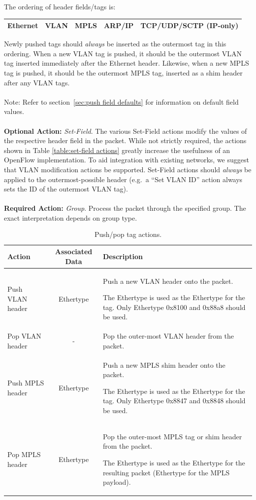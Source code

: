 \documentclass[10pt]{article}
\begin{document}
The ordering of header fields/tags is:
\begin{center}
\begin{tabular}{|l|l|l|l|l|}
\hline
Ethernet & VLAN & MPLS & ARP/IP & TCP/UDP/SCTP (IP-only) \\
\hline
\end{tabular}
\end{center}
Newly pushed tags should \emph{always} be inserted as the outermost tag in this ordering. When a new VLAN tag is pushed, it should be the outermost VLAN tag inserted immediately after the Ethernet header. Likewise, when a new MPLS tag is pushed, it should be the outermost MPLS tag, inserted as a shim header after any VLAN tags.
\\\\
Note: Refer to section~\ref{sec:push field defaults} for information on default field values.
\\\\
\textbf{Optional Action:} \emph{Set-Field}.  The various Set-Field actions modify the values of the respective header field in the packet. While not strictly required, the actions shown in Table \ref{table:set-field actions}  greatly increase the usefulness of an OpenFlow implementation.  To aid integration with existing networks, we suggest that VLAN modification actions be supported. Set-Field actions should \emph{always} be applied to the outermost-possible header (e.g.~a ``Set VLAN ID'' action always sets the ID of the outermost VLAN tag).
\\\\
\textbf{Required Action:} \emph{Group}.  Process the packet through the specified group.  The exact interpretation depends on group type. 

\begin{table}[hbp]
\centering
\footnotesize
\begin{tabularx}{\textwidth}{ |l|c|X| }
\hline
Action & Associated Data & Description \\
\hline
Push VLAN header &
Ethertype &
Push a new VLAN header onto the packet.

The Ethertype is used as the Ethertype for the tag. Only Ethertype 0x8100 and 0x88a8 should be used.
\\
\hline
Pop VLAN header &
- &
Pop the outer-most VLAN header from the packet. \\
\hline
Push MPLS header &
Ethertype &
Push a new MPLS shim header onto the packet.

The Ethertype is used as the Ethertype for the tag. Only Ethertype 0x8847 and 0x8848 should be used.
\\
\hline
Pop MPLS header &
Ethertype &
Pop the outer-most MPLS tag or shim header from the packet.

The Ethertype is used as the Ethertype for the resulting packet (Ethertype for the MPLS payload).
\\
\hline
\end{tabularx}
\caption{Push/pop tag actions.}
\label{table:push pop actions}
\end{table}
\end{document}
